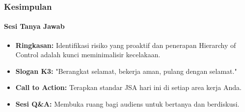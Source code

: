 \documentclass[../main.tex]{subfiles}
\begin{document}
\begin{frame}[mytitle=center, c, mycolor=digiPH_darkblue, dark]
	\frametitle{Kesimpulan}
	\framesubtitle{Sesi Tanya Jawab}

	\begin{itemize}
		\item \textbf{Ringkasan:} Identifikasi risiko yang proaktif dan penerapan Hierarchy of Control adalah kunci meminimalisir kecelakaan.
		\item \textbf{Slogan K3:} "Berangkat selamat, bekerja aman, pulang dengan selamat."
		\item \textbf{Call to Action:} Terapkan standar JSA hari ini di setiap area kerja Anda.
		\item \textbf{Sesi Q\&A:} Membuka ruang bagi audiens untuk bertanya dan berdiskusi.
	\end{itemize}

	\vfill
\end{frame}
\end{document}
